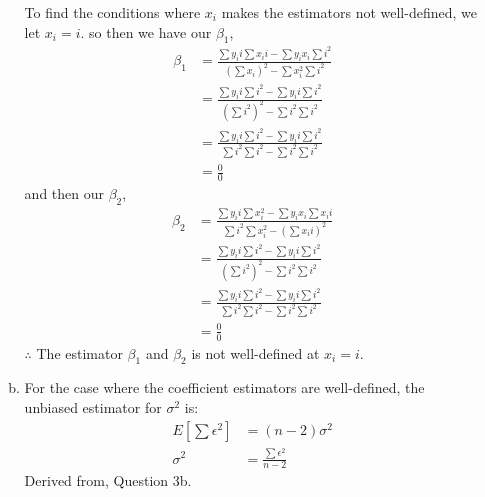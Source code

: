 \documentclass[12pt]{article}
\begin{document}
\begin{enumerate}[1.]
\begin{enumerate}[(a)]
            To find the conditions where $x_i$ makes the estimators not well-defined, we let $x_i = i$.
            so then we have our $\beta_1$,
            \begin{align*}
                \beta_1 &= \frac{\sum y_i i\sum  x_i i - \sum y_i  x_i \sum i^2}{(\sum  x_i)^2 - \sum  x_i^2 \sum i^2 } \\
                &= \frac{\sum y_i i\sum  i^2 - \sum y_i  i \sum i^2}{(\sum i^2)^2 - \sum i^2 \sum i^2 }\\
                &= \frac{\sum y_i i\sum  i^2 - \sum y_i  i \sum i^2}{\sum i^2\sum i^2 - \sum i^2 \sum i^2 }\\
                &= \frac{0}{0}
            \end{align*}
            and then our $\beta_2$, 
            \begin{align*}
                \beta_2 &= \frac{\sum  y_i i \sum  x_i^2 - \sum  y_i x_i \sum  x_i i}{\sum  i^2 \sum  x_i^2 - (\sum  x_i i)^2} \\
                &= \frac{\sum  y_i i \sum   i^2 - \sum  y_i  i \sum   i^2}{(\sum i^2)^2 - \sum i^2 \sum i^2 }\\
                &= \frac{\sum  y_i i \sum   i^2 - \sum  y_i  i \sum   i^2}{\sum i^2 \sum i^2 - \sum i^2 \sum i^2 }\\
                &= \frac{0}{0}
            \end{align*}
            $\therefore$ The estimator $\beta_1$ and $\beta_2$ is not well-defined at $x_i = i$.

            \item For the case where the coefficient estimators are well-defined, the unbiased estimator for $\sigma^2$ is:
            \begin{align*}
                E[\sum \epsilon^2] &= (n-2)\sigma^2 \\ 
                \sigma^2 &= \frac{\sum \epsilon^2}{n-2}
            \end{align*}
            Derived from, Question 3b.
        \end{enumerate}
    

\end{enumerate}
\end{document}
